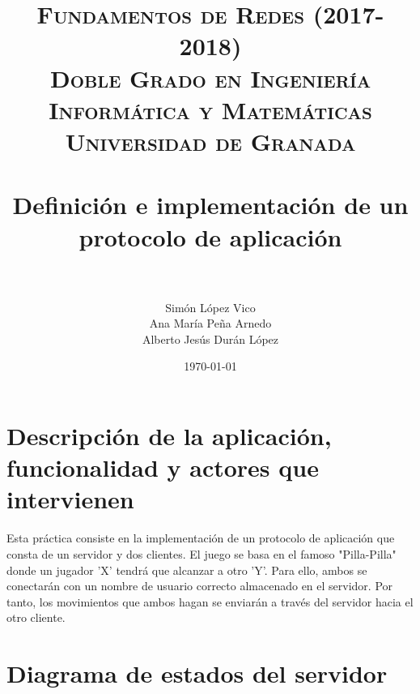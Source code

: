 

\title{	
	\normalfont \normalsize 
	\textsc{\textbf{Fundamentos de Redes (2017-2018)} \\ Doble Grado en Ingeniería Informática y Matemáticas \\ Universidad de Granada} \\ [25pt] 
	\horrule{0.5pt} \\[0.4cm]
	\huge Definición e implementación de un \\ protocolo de aplicación \\ 
	\horrule{2pt} \\[0.5cm] 
}

\author{Simón López Vico \\ Ana María Peña Arnedo \\ Alberto Jesús Durán López} 
\date{\normalsize\today}



	\maketitle       %
	\newpage 
	\tableofcontents %
	\newpage
	
	

	
	
\section{Descripción de la aplicación, funcionalidad y actores que intervienen}
	
	
Esta práctica consiste en la implementación de un protocolo de aplicación que consta
de un servidor y dos clientes. El juego se basa en el famoso "Pilla-Pilla"   donde 
un jugador 'X' tendrá que alcanzar a otro 'Y'. Para ello, ambos se conectarán con un nombre de usuario correcto almacenado en el servidor. Por tanto, los movimientos que ambos hagan se enviarán a través del servidor hacia el otro cliente.
		
	
	
	
\section{Diagrama de estados del servidor}

